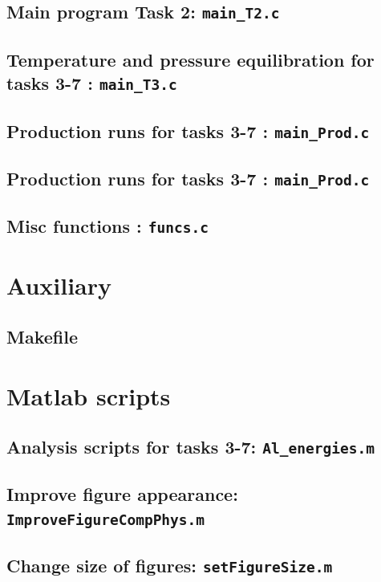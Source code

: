 \subsection{Main program  Task 2: \texttt{main\_T2.c}}


\subsection{Temperature and pressure equilibration for tasks 3-7 : \texttt{main\_T3.c}}


\subsection{Production runs for tasks 3-7 : \texttt{main\_Prod.c}}


\subsection{Production runs for tasks 3-7 : \texttt{main\_Prod.c}}



\subsection{Misc functions : \texttt{funcs.c}}


\section{Auxiliary }
\subsection{Makefile}




\section{Matlab scripts}
\subsection{Analysis scripts for tasks 3-7: \texttt{Al\_energies.m}}


\subsection{Improve figure appearance: \texttt{ImproveFigureCompPhys.m}}


\subsection{Change size of figures: \texttt{setFigureSize.m}}


